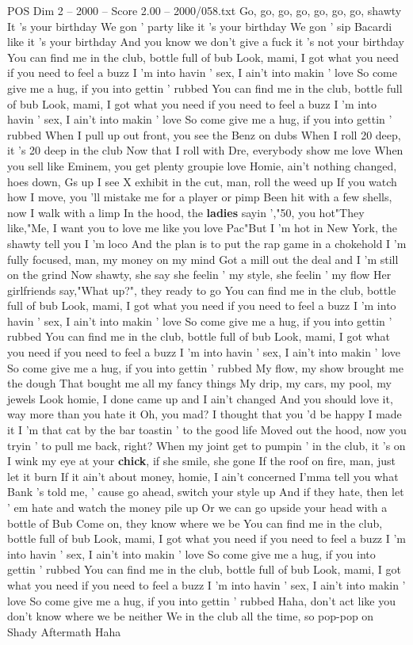 \begin{textsample}{POS Dim 2 – 2000 – Score 2.00 – 2000/058.txt}  \label{ex:f2_pos_010}
Go, go, go, go, go, go, go, shawty It 's your birthday We gon ' party like it 's your birthday We gon ' sip Bacardi like it 's your birthday And you know we don't give a fuck it 's not your birthday You can find me in the club, bottle full of bub Look, mami, I got what you need if you need to feel a buzz I 'm into havin ' sex, I ain't into makin ' love So come give me a hug, if you into gettin ' rubbed You can find me in the club, bottle full of bub Look, mami, I got what you need if you need to feel a buzz I 'm into havin ' sex, I ain't into makin ' love So come give me a hug, if you into gettin ' rubbed When I pull up out front, you see the Benz on dubs When I roll 20 deep, it 's 20 deep in the club Now that I roll with Dre, everybody show me love When you sell like Eminem, you get plenty groupie love Homie, ain't nothing changed, hoes down, Gs up I see X exhibit in the cut, man, roll the weed up If you watch how I move, you 'll mistake me for a player or pimp Been hit with a few shells, now I walk with a limp In the hood, the \textbf{ladies} sayin ',"50, you hot"They like,"Me, I want you to love me like you love Pac"But I 'm hot in New York, the shawty tell you I 'm loco And the plan is to put the rap game in a chokehold I 'm fully focused, man, my money on my mind Got a mill out the deal and I 'm still on the grind Now shawty, she say she feelin ' my style, she feelin ' my flow Her girlfriends say,"What up?", they ready to go You can find me in the club, bottle full of bub Look, mami, I got what you need if you need to feel a buzz I 'm into havin ' sex, I ain't into makin ' love So come give me a hug, if you into gettin ' rubbed You can find me in the club, bottle full of bub Look, mami, I got what you need if you need to feel a buzz I 'm into havin ' sex, I ain't into makin ' love So come give me a hug, if you into gettin ' rubbed My flow, my show brought me the dough That bought me all my fancy things My drip, my cars, my pool, my jewels Look homie, I done came up and I ain't changed And you should love it, way more than you hate it Oh, you mad?
I thought that you 'd be happy I made it I 'm that cat by the bar toastin ' to the good life Moved out the hood, now you tryin ' to pull me back, right?
When my joint get to pumpin ' in the club, it 's on I wink my eye at your \textbf{chick}, if she smile, she gone If the roof on fire, man, just let it burn If it ain't about money, homie, I ain't concerned I'mma tell you what Bank 's told me, ' cause go ahead, switch your style up And if they hate, then let ' em hate and watch the money pile up Or we can go upside your head with a bottle of Bub Come on, they know where we be You can find me in the club, bottle full of bub Look, mami, I got what you need if you need to feel a buzz I 'm into havin ' sex, I ain't into makin ' love So come give me a hug, if you into gettin ' rubbed You can find me in the club, bottle full of bub Look, mami, I got what you need if you need to feel a buzz I 'm into havin ' sex, I ain't into makin ' love So come give me a hug, if you into gettin ' rubbed Haha, don't act like you don't know where we be neither We in the club all the time, so pop-pop on Shady Aftermath Haha

\end{textsample}

